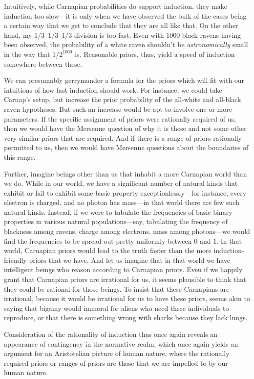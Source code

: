 Intuitively, while Carnapian probabilities do support induction, they make induction too slow---it is only when we have observed the bulk of the cases
being a certain way that we get to conclude that they are all like that. On the other hand, my $1/3$--$1/3$--$1/3$ division is too fast. Even with
$1000$ black ravens having been observed, the probability of a white raven shouldn't be \textit{astronomically} small in the way
that $1/2^{1000}$ is. Reasonable priors, thus, yield a speed of induction somewhere between these. 

We can presumably gerrymander a formula for the priors which will fit with our intuitions of how fast induction should work.
For instance, we could take Carnap's setup, but increase the prior probability of the all-white and all-black raven hypotheses. 
But such an increase would be apt to involve one or more parameters. If the specific assignment of priors were rationally
required of us, then we would have the Mersenne question of why it is these and not some other very similar priors that are required.
And if there is a range of priors rationally permitted to us, then we would have Mersenne questions about the boundaries of
this range. 

Further, imagine beings other than us that inhabit a more Carnapian world than we do. While in our world, we have a significant number of natural kinds
that exhibit or fail to exhibit some basic property exceptionlessly---for instance, every electron is charged, and no photon 
has mass---in that world there are few such natural kinds. Instead, if we were to tabulate the frequencies of basic binary properties
in various natural populations---say, tabulating the frequency of blackness among ravens, charge among electrons, mass among photons---we 
would find the frequencies to be spread out pretty uniformly between $0$ and $1$. In that world, Carnapian priors would lead to the truth faster
than the more induction-friendly priors that we have. And let us imagine that in that world we have intelligent beings who reason according
to Carnapian priors. Even if we happily grant that Carnapian priors are irrational for us, it seems plausible to think that they could be
rational for those beings. To insist that these Carnapians are irrational, because it would be irrational for us to have these priors,
seems akin to saying that bigamy would immoral for aliens who need three individuals to reproduce, or that there is something wrong with sharks
because they lack lungs. 

Consideration of the rationality of induction thus once again reveals an appearance of contingency in the normative realm, which
once again yields an argument for an Aristotelian picture of human nature, where the rationally required priors or ranges of priors
are those that we are impelled to by our human nature.


